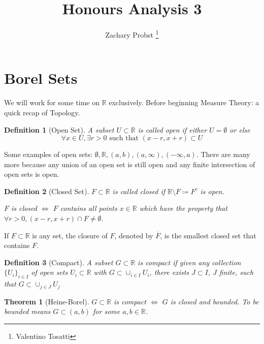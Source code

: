 \documentclass[11pt]{article}
\title{Honours Analysis 3}
\author{Zachary Probst \thanks{Valentino Tosatti}}
\newtheorem{theorem}{Theorem}[section]
\newtheorem{definition}{Definition}[section]
\begin{document}
    \maketitle

    \section{Borel Sets}\label{sec:borel-sets}
    
    We will work for some time on $\mathbb{R}$ exclusively.
    Before beginning Measure Theory: a quick recap of Topology.
    
    \begin{definition}[Open Set]
        A subset $U \subset \mathbb{R}$ is called \emph{open} if either $U = \emptyset$ or else
        \[
            \forall x \in U, \exists r > 0 \text{ such that } (x-r,x+r) \subset U
        \]
    \end{definition}

    Some examples of open sets: $\emptyset, \mathbb{R}, (a,b), (a,\infty), (-\infty, a)$.
    There are many more because any union of an open set is still open and any finite intersection of open sets is open.

    \begin{definition}[Closed Set]
        $F \subset \mathbb{R}$ is called \emph{closed} if $\mathbb{R} \setminus F \coloneqq F^c $ is open.

        $F$ is closed $\iff$ $F$ contains all points $x \in \mathbb{R}$ which have the property that $\forall r > 0, (x-r, x+r) \cap F \neq \emptyset$.
    \end{definition}

    If $F \subset \mathbb{R}$ is any set, the closure of $F$, denoted by $\overline{F}$, is the smallest closed set that contains $F$.

    \begin{definition}[Compact]
        A subset $G \subset \mathbb{R}$ is \emph{compact} if given any collection $\{ U_i \}_{i \in I}$ of open sets $U_i \subset \mathbb{R}$ with $G \subset \cup_{i \in I} U_i$, there exists $J \subset I$, $J$ finite, such that $G \subset \cup_{j \in J} U_j$
    \end{definition}

    \begin{theorem}[Heine-Borel]
        $G \subset \mathbb{R}$ is compact $\iff$ $G$ is closed and bounded.
        To be bounded means $G \subset (a,b)$ for some $a,b \in \mathbb{R}$.
    \end{theorem}
\end{document}
